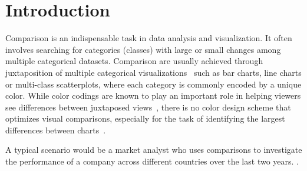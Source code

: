 \section{Introduction}
Comparison is an indispensable task in data analysis and visualization. It often involves searching for categories (classes) with large or small changes among multiple categorical datasets.
Comparison are usually achieved through juxtaposition of multiple categorical visualizations~\cite{Gleicher18,LYi21} such as bar charts, line charts or multi-class scatterplots, where each category is commonly encoded by a unique color.
While color codings are known to play an important role in helping viewers see differences between juxtaposed views~\cite{Tominski08,Albers11,Gleicher18}, there is no color design scheme that optimizes visual comparisons, especially for the task of identifying the largest differences between charts~\cite{Ondov19}. %

A typical scenario would be  a market analyst who uses comparisons to
investigate the performance of a company across different countries over the last two years.
.


